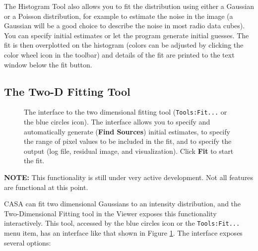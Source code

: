 The Histogram Tool also allows you to fit the distribution using either a Gaussian or a Poisson distribution, for example to estimate the
noise in the image (a Gaussian will be a good choice to describe the noise in most radio data cubes). You can specify initial 
estimates or let the program generate initial guesses. The fit is then overplotted on the histogram (colors can be adjusted by clicking
the color wheel icon in the toolbar) and details of the fit are printed to the text window below the fit button.


\subsection{The Two-D Fitting Tool}
\label{section:display.image.twodfit}

\begin{figure}[h!]
\begin{center}
\caption{\label{fig:viewer_twodfit} The interface to the two dimensional fitting tool ({\tt Tools:Fit...} or the blue circles icon). 
The interface allows you to specify and automatically generate ({\bf Find Sources}) initial estimates, to specify the range of
pixel values to be included in the fit, and to specify the output (log file, residual image, and visualization). Click {\bf Fit} to 
start the fit.
}
\hrulefill
\end{center}
\end{figure}

{\bf NOTE:} This functionality is still under very active development. Not all features are functional at this point.

CASA can fit two dimensional Gaussians to an intensity distribution, and the Two-Dimensional Fitting tool in the Viewer exposes
this functionality interactively. This tool, accessed by the blue circles icon or the {\tt Tools:Fit...} menu item, has an interface
like that shown in Figure \ref{fig:viewer_twodfit}. The interface exposes several options:

